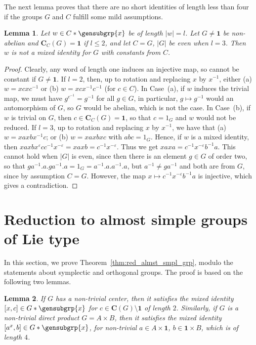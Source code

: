 \documentclass[a4paper,11pt]{amsproc}
\newcommand{\norm}[1]{\lvert#1\rvert}%
\newcommand{\card}[1]{\left\lvert#1\right\rvert}%
\newcommand{\trivgrp}{\mathbf{1}}%
\newcommand{\C}{\mathbf{C}}%
\theoremstyle{plain}
\newtheorem{lemma}{Lemma}[section]
\theoremstyle{definition}
\begin{document}
	The next lemma proves that there are no short identities of length less than four if the groups $G$ and $C$ fulfill some mild assumptions.
	
	\begin{lemma}\label{lem:no_shrt_ids}
		Let $w\in C\ast\gensubgrp{x}$ be of length $\norm{w}=l$. Let $G\neq\trivgrp$ be non-abelian and $\C_C(G)=\trivgrp$ if $l\leq 2$, and let $C=G$, $\card{G}$ be even when $l=3$. Then $w$ is not a mixed identity for $G$ with constants from $C$. 
	\end{lemma}
	
	\begin{proof}
		Clearly, any word of length one induces an injective map, so cannot be constant if $G\neq\trivgrp$. If $l=2$, then, up to rotation and replacing $x$ by $x^{-1}$, either (a) $w=xcxc^{-1}$ or (b) $w=xcx^{-1}c^{-1}$ (for $c\in C$). In Case~(a), if $w$ induces the trivial map, we must have $g^{c^{-1}}=g^{-1}$ for all $g\in G$, in particular, $g\mapsto g^{-1}$ would an automorphism of $G$, so $G$ would be abelian, which is not the case. In Case~(b), if $w$ is trivial on $G$, then $c\in\C_C(G)=\trivgrp$, so that $c=1_G$ and $w$ would not be reduced. If $l=3$, up to rotation and replacing $x$ by $x^{-1}$, we have that (a) $w=xaxbx^{-1}c$; or (b) $w=xaxbxc$  with $abc=1_G$.
		Hence, if $w$ is a mixed identity, then $xaxbx^\varepsilon cc^{-1}x^{-\varepsilon}=xaxb=c^{-1}x^{-\varepsilon}$. Thus we get $xaxa=c^{-1}x^{-\varepsilon}b^{-1}a$. This cannot hold when $\card{G}$ is even, since then there is an element $g\in G$ of order two, so that $ga^{-1}.a.ga^{-1}.a=1_G=a^{-1}.a.a^{-1}.a$, but $a^{-1}\neq ga^{-1}$ and both are from $G$, since by assumption $C=G$. However, the map $x\mapsto c^{-1}x^{-\varepsilon}b^{-1}a$ is injective, which gives a contradiction.
	\end{proof}
	
	\section{Reduction to almost simple groups of Lie type}
	
	In this section, we prove  Theorem~\ref{thm:red_almst_smpl_grp}, modulo the statements about symplectic and orthogonal groups. The proof is based on the following two lemmas.
	
	\begin{lemma}\label{lem:ab_prod_cse_shrt_id}
		If $G$ has a non-trivial center, then it satisfies the mixed identity $[x,c]\in G\ast\gensubgrp{x}$ for $c\in \C(G)\setminus\trivgrp$ of length $2$. Similarly, if $G$ is a non-trivial direct product $G=A\times B$, then it satisfies the mixed identity $[a^x,b]\in G\ast\gensubgrp{x}$, for non-trivial $a\in A \times\trivgrp$, $b \in\trivgrp\times B$, which is of length $4$.
	\end{lemma}
	
\end{document}
